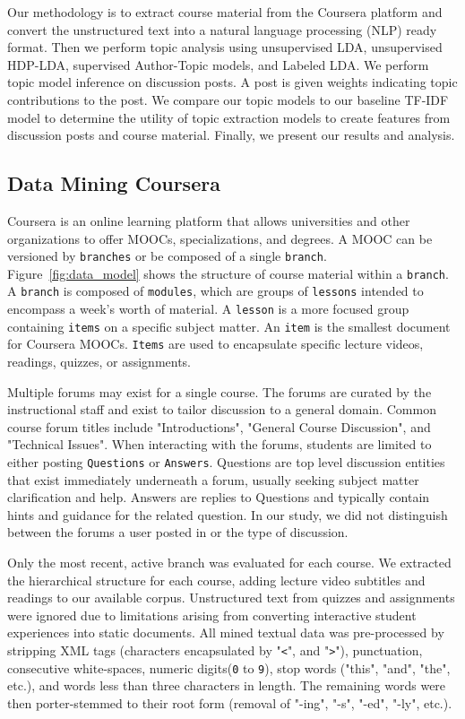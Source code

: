 \documentclass[sigconf, nonacm=true]{acmart}
\begin{document}
Our methodology is to extract course material from the Coursera platform and convert the unstructured text into a natural language processing (NLP) ready format.
Then we perform topic analysis using unsupervised LDA, unsupervised HDP-LDA, supervised Author-Topic models, and Labeled LDA.
We perform topic model inference on discussion posts. A post is given weights indicating topic contributions to the post.
We compare our topic models to our baseline TF-IDF model to determine the utility of topic extraction models to create features from discussion posts and course material.
Finally, we present our results and analysis.

\subsection{Data Mining Coursera}
Coursera is an online learning platform that allows universities and other organizations to offer MOOCs, specializations, and degrees.
A MOOC can be versioned by \texttt{branches} or be composed of a single \texttt{branch}.
Figure~\ref{fig:data_model} shows the structure of course material within a \texttt{branch}.
A \texttt{branch} is composed of \texttt{modules}, which are groups of \texttt{lessons} intended to encompass a week's worth of material.
A \texttt{lesson} is a more focused group containing \texttt{items} on a specific subject matter.
An \texttt{item} is the smallest document for Coursera MOOCs. \texttt{Items} are used to encapsulate specific lecture videos, readings, quizzes, or assignments.

Multiple forums may exist for a single course.
The forums are curated by the instructional staff and exist to tailor discussion to a general domain.
Common course forum titles include "Introductions", "General Course Discussion", and "Technical Issues".
When interacting with the forums, students are limited to either posting \texttt{Questions} or \texttt{Answers}.
Questions are top level discussion entities that exist immediately underneath a forum, usually seeking subject matter clarification and help.
Answers are replies to Questions and typically contain hints and guidance for the related question.
In our study, we did not distinguish between the forums a user posted in or the type of discussion.

Only the most recent, active branch was evaluated for each course.
We extracted the hierarchical structure for each course, adding lecture video subtitles and readings to our available corpus.
Unstructured text from quizzes and assignments were ignored due to limitations arising from converting interactive student experiences into static documents.
All mined textual data was pre-processed by stripping XML tags (characters encapsulated by "\texttt{<}", and "\texttt{>}"), punctuation, consecutive white-spaces, numeric digits(\texttt{0} to \texttt{9}), stop words ("this", "and", "the", etc.), and words less than three characters in length.
The remaining words were then porter-stemmed to their root form (removal of "-ing", "-s", "-ed", "-ly", etc.).
\end{document}

